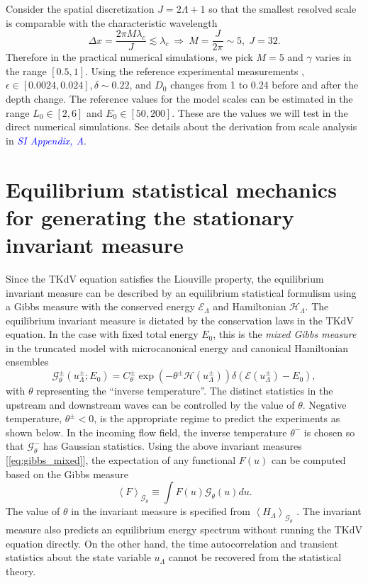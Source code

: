 \documentclass[9pt,twocolumn,twoside,lineno]{pnas-new}
\begin{document}
Consider the spatial discretization $J=2\Lambda+1$ so that the smallest
resolved scale is comparable with the characteristic wavelength
\[
\Delta x=\frac{2\pi M\lambda_{c}}{J}\lesssim\lambda_{c}\:\Rightarrow\:M=\frac{J}{2\pi}\sim5,\;J=32.
\]
Therefore in the practical numerical simulations, we pick $M=5$ and
$\gamma$ varies in the range $\left[0.5,1\right]$. Using the reference
experimental measurements \cite{bolles2018anomalous}, $\epsilon\in\left[0.0024,0.024\right],\delta\sim0.22$,
and $D_{0}$ changes from 1 to 0.24 before and after the depth change.
The reference values for the model scales can be estimated in the
range $L_{0}\in\left[2,6\right]$ and $E_{0}\in\left[50,200\right]$.
These are the values we will test in the direct numerical simulations.
See details about the derivation from scale analysis in \textcolor{blue}{\emph{SI Appendix, A}}.

\section{Equilibrium statistical mechanics for generating the stationary invariant measure}

Since the TKdV equation satisfies the Liouville property, the equilibrium
invariant measure can be described by an equilibrium statistical formulism
\cite{abramov2003hamiltonian,majda2006nonlinear,bajars2013weakly}
using a Gibbs measure with the conserved energy $\mathcal{E}_{\Lambda}$ and
Hamiltonian $\mathcal{H}_{\Lambda}$. The equilibrium invariant measure is dictated
by the conservation laws in the TKdV equation. In the case with fixed
total energy $E_{0}$, this is the \emph{mixed Gibbs measure} in the
truncated model with microcanonical energy and canonical Hamiltonian
ensembles \cite{abramov2003hamiltonian}
\begin{equation}
\mathcal{G}_{\theta}^{\pm}\left(u_{\Lambda}^{\pm};E_{0}\right)=C_{\theta}^{\pm}\exp\left(-\theta^{\pm}\mathcal{H}\left(u_{\Lambda}^{\pm}\right)\right)\delta\left(\mathcal{E}\left(u_{\Lambda}^{\pm}\right)-E_{0}\right),\label{eq:gibbs_mixed}
\end{equation}
with $\theta$ representing the ``inverse temperature''. The distinct
statistics in the upstream and downstream waves can be controlled
by the value of $\theta$. Negative temperature, $\theta^{\pm}<0$, is the appropriate regime to predict the
experiments as shown below. In the incoming flow field, the inverse
temperature $\theta^{-}$ is chosen so that $\mathcal{G}_{\theta}^{-}$
has Gaussian statistics. Using the above invariant measures [\ref{eq:gibbs_mixed}],
the expectation of any functional $F\left(u\right)$ can be computed
based on the Gibbs measure 
\[
\left\langle F\right\rangle _{\mathcal{G}_{\theta}}\equiv\int F\left(u\right)\mathcal{G}_{\theta}\left(u\right)du.
\]
The value of $\theta$ in the invariant measure is specified from
$\left\langle H_{\Lambda}\right\rangle _{\mathcal{G}_{\theta}}$ \cite{abramov2003hamiltonian,bajars2013weakly}.
The invariant measure also predicts an equilibrium energy spectrum
without running the TKdV equation directly. On the other hand, the
time autocorrelation and transient statistics about the state variable
$u_{\Lambda}$ cannot be recovered from the statistical theory.
\end{document}
